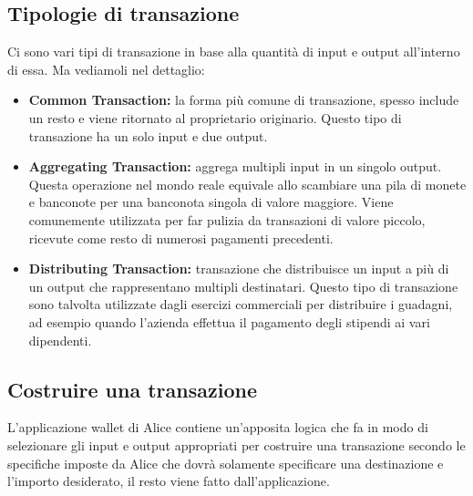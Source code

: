 \subsection*{Tipologie di transazione}
Ci sono vari tipi di transazione in base alla quantità di input e output all'interno di essa. Ma vediamoli nel dettaglio:
\begin{itemize}
	\item \textbf{Common Transaction:} la forma più comune di transazione, spesso include un resto e viene ritornato al proprietario originario. Questo tipo di transazione ha un solo input e due output.
	\item \textbf{Aggregating Transaction:} aggrega multipli input in un singolo output. Questa operazione nel mondo reale equivale allo scambiare una pila di monete e banconote per una banconota singola di valore maggiore. Viene comunemente utilizzata per far pulizia da transazioni di valore piccolo, ricevute come resto di numerosi pagamenti precedenti.
	\item \textbf{Distributing Transaction:} transazione che distribuisce un input a più di un output che rappresentano multipli destinatari. Questo tipo di transazione sono talvolta utilizzate dagli esercizi commerciali per distribuire i guadagni, ad esempio quando l'azienda effettua il pagamento degli stipendi ai vari dipendenti.
\end{itemize}

\subsection{Costruire una transazione}
L'applicazione wallet di Alice contiene un'apposita logica che fa in modo di selezionare gli input e output appropriati per costruire una transazione secondo le specifiche imposte da Alice che dovrà solamente specificare una destinazione e l'importo desiderato, il resto viene fatto dall'applicazione.

